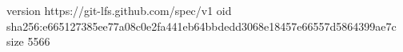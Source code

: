 version https://git-lfs.github.com/spec/v1
oid sha256:e665127385ee77a08c0e2fa441eb64bbdedd3068e18457e66557d5864399ae7c
size 5566
